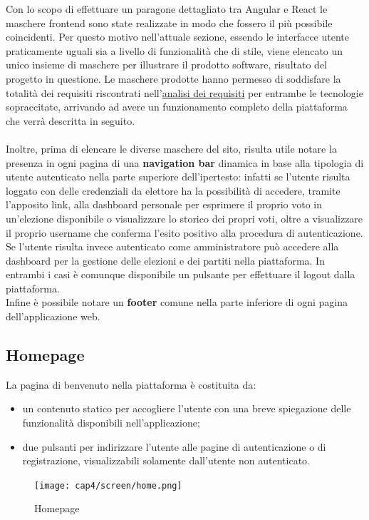 Con lo scopo di effettuare un paragone dettagliato tra Angular e React le maschere \gls{frontend} sono state realizzate in modo che fossero il più possibile coincidenti. Per questo motivo nell'attuale sezione, essendo le interfacce utente praticamente uguali sia a livello di funzionalità che di stile, viene elencato un unico insieme di maschere per illustrare il prodotto software, risultato del progetto in questione. Le maschere prodotte hanno permesso di soddisfare la totalità dei requisiti riscontrati nell'\hyperref[cap:analisi-requisiti]{analisi dei requisiti} per entrambe le tecnologie sopraccitate, arrivando ad avere un funzionamento completo della piattaforma che verrà descritta in seguito. \\ \\
Inoltre, prima di elencare le diverse maschere del sito, risulta utile notare la presenza in ogni pagina di una \textbf{navigation bar} dinamica in base alla tipologia di utente autenticato nella parte superiore dell'ipertesto: infatti se l'utente risulta loggato con delle credenziali da elettore ha la possibilità di accedere, tramite l'apposito link, alla dashboard personale per esprimere il proprio voto in un'elezione disponibile o visualizzare lo storico dei propri voti, oltre a visualizzare il proprio username che conferma l'esito positivo alla procedura di autenticazione. Se l'utente risulta invece autenticato come amministratore può accedere alla dashboard per la gestione delle elezioni e dei partiti nella piattaforma. In entrambi i casi è comunque disponibile un pulsante per effettuare il logout dalla piattaforma. \\
Infine è possibile notare un \textbf{footer} comune nella parte inferiore di ogni pagina dell'applicazione web.

\subsection{Homepage}
La pagina di benvenuto nella piattaforma è costituita da:
\begin{itemize}
    \item un contenuto statico per accogliere l'utente con una breve spiegazione delle funzionalità disponibili nell'applicazione;
    \item due pulsanti per indirizzare l'utente alle pagine di autenticazione o di registrazione, visualizzabili solamente dall'utente non autenticato.
\end{itemize}
\begin{figure}[H] 
    \centering 
    \texttt{[image: cap4/screen/home.png]}
    \caption{Homepage}
\end{figure}

